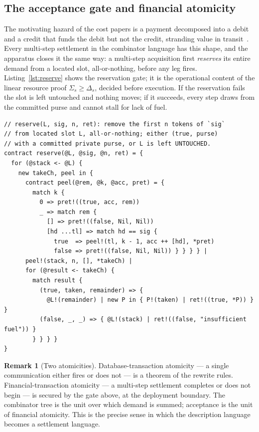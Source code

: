 \documentclass[11pt]{article}
\theoremstyle{definition}
\newtheorem{remark}{Remark}[section]
\theoremstyle{plain}
\begin{document}
\subsection{The acceptance gate and financial atomicity}

The motivating hazard of the cost papers is a payment decomposed into a debit and a credit that funds
the debit but not the credit, stranding value in transit~\cite[\S8.2]{CAR2026}. Every multi-step
settlement in the combinator language has this shape, and the apparatus closes it the same way: a
multi-step acquisition first \emph{reserves} its entire demand from a located slot, all-or-nothing,
before any leg fires. Listing~\ref{lst:reserve} shows the reservation gate; it is the operational
content of the linear resource proof $\Sigma_s \ge \Delta_s$, decided before execution. If the
reservation fails the slot is left untouched and nothing moves; if it succeeds, every step draws from
the committed purse and cannot stall for lack of fuel.

\begin{lstlisting}[caption={The acceptance gate: an atomic reservation from a located slot, the operational form of the linear resource proof.},label={lst:reserve}]
// reserve(L, sig, n, ret): remove the first n tokens of `sig`
// from located slot L, all-or-nothing; either (true, purse)
// with a committed private purse, or L is left UNTOUCHED.
contract reserve(@L, @sig, @n, ret) = {
  for (@stack <- @L) {
    new takeCh, peel in {
      contract peel(@rem, @k, @acc, pret) = {
        match k {
          0 => pret!((true, acc, rem))
          _ => match rem {
            [] => pret!((false, Nil, Nil))
            [hd ...tl] => match hd == sig {
              true  => peel!(tl, k - 1, acc ++ [hd], *pret)
              false => pret!((false, Nil, Nil)) } } } } |
      peel!(stack, n, [], *takeCh) |
      for (@result <- takeCh) {
        match result {
          (true, taken, remainder) => {
            @L!(remainder) | new P in { P!(taken) | ret!((true, *P)) } }
          (false, _, _) => { @L!(stack) | ret!((false, "insufficient fuel")) }
        } } } }
}
\end{lstlisting}

\begin{remark}[Two atomicities]
Database-transaction atomicity --- a single communication either fires or does not --- is a theorem
of the rewrite rules. Financial-transaction atomicity --- a multi-step settlement completes or does
not begin --- is secured by the gate above, at the deployment boundary. The combinator tree is the
unit over which demand is summed; acceptance is the unit of financial atomicity. This is the precise
sense in which the description language becomes a settlement language.
\end{remark}
\end{document}
